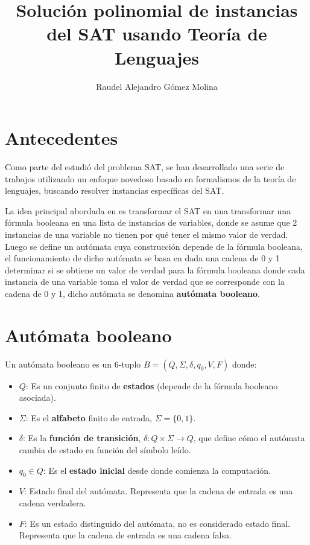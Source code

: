 \documentclass{article}
\title{Solución polinomial de instancias del SAT usando Teoría de Lenguajes}
\author{Raudel Alejandro Gómez Molina}
\begin{document}
\maketitle

\section{Antecedentes}

Como parte del estudió del problema SAT, se han desarrollado una serie de trabajos utilizando un enfoque
novedoso basado en formalismos de la teoría de lenguajes, buscando resolver instancias específicas del SAT.

La idea principal abordada en \cite{aCFSAT} es transformar el SAT en una transformar una fórmula booleana en una lista de instancias de variables,
donde se asume que 2 instancias de una variable no tienen por qué tener el mismo valor de verdad. Luego
se define un autómata cuya construcción depende de la fórmula booleana, el funcionamiento
de dicho autómata se basa en dada una cadena de 0 y 1 determinar si se obtiene un valor
de verdad para la fórmula booleana donde cada instancia de una variable toma el valor de verdad que se
corresponde con la cadena de 0 y 1, dicho autómata se denomina \textbf{autómata booleano}.

\section{Autómata booleano}

Un autómata booleano \cite{aCFSAT} es un 6-tuplo $B=(Q,\Sigma,\delta,q_0,V,F)$ donde:

\begin{itemize}
      \item $Q$: Es un conjunto finito de \textbf{estados} (depende de la fórmula booleano asociada).
      \item $\Sigma$: Es el \textbf{alfabeto} finito de entrada, $\Sigma =\{0,1\}$.
      \item $\delta$: Es la \textbf{función de transición}, $\delta: Q \times \Sigma \to Q$, que define cómo el autómata cambia de estado en función del símbolo leído.
      \item $q_0 \in Q$: Es el \textbf{estado inicial} desde donde comienza la computación.
      \item  $V$: Estado final del autómata. Representa que la cadena de entrada es una
            cadena verdadera.
      \item  $F$: Es un estado distinguido del autómata, no es considerado estado final.
            Representa que la cadena de entrada es una cadena falsa.

\end{itemize}
\end{document}

